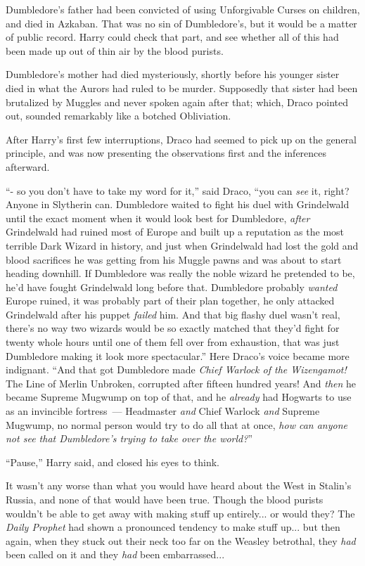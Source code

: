 Dumbledore's father had been convicted of using Unforgivable Curses on children, and died in Azkaban. That was no sin of Dumbledore's, but it would be a matter of public record. Harry could check that part, and see whether all of this had been made up out of thin air by the blood purists.

Dumbledore's mother had died mysteriously, shortly before his younger sister died in what the Aurors had ruled to be murder. Supposedly that sister had been brutalized by Muggles and never spoken again after that; which, Draco pointed out, sounded remarkably like a botched Obliviation.

After Harry's first few interruptions, Draco had seemed to pick up on the general principle, and was now presenting the observations first and the inferences afterward.

``- so you don't have to take my word for it,'' said Draco, ``you can \emph{see} it, right? Anyone in Slytherin can. Dumbledore waited to fight his duel with Grindelwald until the exact moment when it would look best for Dumbledore, \emph{after} Grindelwald had ruined most of Europe and built up a reputation as the most terrible Dark Wizard in history, and just when Grindelwald had lost the gold and blood sacrifices he was getting from his Muggle pawns and was about to start heading downhill. If Dumbledore was really the noble wizard he pretended to be, he'd have fought Grindelwald long before that. Dumbledore probably \emph{wanted} Europe ruined, it was probably part of their plan together, he only attacked Grindelwald after his puppet \emph{failed} him. And that big flashy duel wasn't real, there's no way two wizards would be so exactly matched that they'd fight for twenty whole hours until one of them fell over from exhaustion, that was just Dumbledore making it look more spectacular.'' Here Draco's voice became more indignant. ``And that got Dumbledore made \emph{Chief Warlock of the Wizengamot!} The Line of Merlin Unbroken, corrupted after fifteen hundred years! And \emph{then} he became Supreme Mugwump on top of that, and he \emph{already} had Hogwarts to use as an invincible fortress~--- Headmaster \emph{and} Chief Warlock \emph{and} Supreme Mugwump, no normal person would try to do all that at once, \emph{how can anyone not see that Dumbledore's trying to take over the world?}''

``Pause,'' Harry said, and closed his eyes to think.

It wasn't any worse than what you would have heard about the West in Stalin's Russia, and none of that would have been true. Though the blood purists wouldn't be able to get away with making stuff up entirely... or would they? The \emph{Daily Prophet} had shown a pronounced tendency to make stuff up... but then again, when they stuck out their neck too far on the Weasley betrothal, they \emph{had} been called on it and they \emph{had} been embarrassed...

